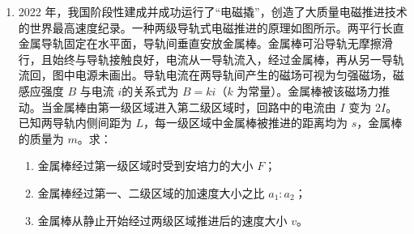 \documentclass[\gkver]{gaokaozhenti}
\begin{document}
\begin{enumerate}
\item
2022 年，我国阶段性建成并成功运行了“电磁撬”，创造了大质量电磁推进技术的世界最高速度纪录。一种两级导轨式电磁推进的原理如图所示。两平行长直金属导轨固定在水平面，导轨间垂直安放金属棒。金属棒可沿导轨无摩擦滑行，且始终与导轨接触良好，电流从一导轨流入，经过金属棒，再从另一导轨流回，图中电源未画出。导轨电流在两导轨间产生的磁场可视为匀强磁场，磁感应强度 $B$ 与电流 $i $的关系式为 $B = ki$（$k$ 为常量）。金属棒被该磁场力推动。当金属棒由第一级区域进入第二级区域时，回路中的电流由 $I$ 变为 2$I$。已知两导轨内侧间距为 $L$，每一级区域中金属棒被推进的距离均为 $s$，金属棒的质量为 $m$。求：
\begin{enumerate}
	\item
	金属棒经过第一级区域时受到安培力的大小 $F$；
	\item
	金属棒经过第一、二级区域的加速度大小之比 $a_{1}:a_{2}$；
	\item
	金属棒从静止开始经过两级区域推进后的速度大小 $v$。
\end{enumerate}
\end{enumerate}
\end{document}
